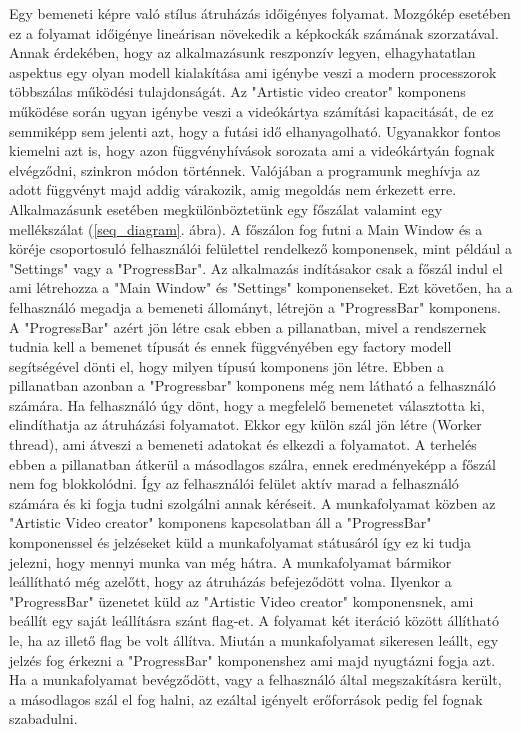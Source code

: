 \documentclass[12pt, a4paper, oneside]{book}
\theoremstyle{tetel}
\begin{document}
Egy bemeneti képre való stílus átruházás időigényes folyamat. Mozgókép esetében ez a folyamat időigénye lineárisan növekedik a képkockák számának szorzatával. Annak érdekében, hogy az alkalmazásunk reszponzív legyen, elhagyhatatlan aspektus egy olyan modell kialakítása ami igénybe veszi a modern processzorok többszálas működési tulajdonságát. Az "Artistic video creator" komponens működése során ugyan igénybe veszi a videókártya számítási kapacitását, de ez semmiképp sem jelenti azt, hogy a futási idő elhanyagolható. Ugyanakkor fontos kiemelni azt is, hogy azon függvényhívások sorozata ami a videókártyán fognak elvégződni, szinkron módon történnek. Valójában a programunk meghívja az adott függvényt majd addig várakozik, amig megoldás nem érkezett erre.
\newline
\indent
Alkalmazásunk esetében megkülönböztetünk egy főszálat valamint egy mellékszálat (\ref{seq_diagram}. ábra). A főszálon fog futni a Main Window és a köréje csoportosuló felhasználói felülettel rendelkező komponensek, mint például a "Settings" vagy a "ProgressBar". Az alkalmazás indításakor csak a főszál indul el ami létrehozza a "Main Window" és "Settings" komponenseket. Ezt követően, ha a felhasználó megadja a bemeneti állományt, létrejön a "ProgressBar" komponens. A "ProgressBar" azért jön létre csak ebben a pillanatban, mivel a rendszernek tudnia kell a bemenet típusát és ennek függvényében egy factory modell segítségével dönti el, hogy milyen típusú komponens jön létre. Ebben a pillanatban azonban a "Progressbar" komponens még nem látható a felhasználó számára.
\newline
\indent
Ha felhasználó úgy dönt, hogy a megfelelő bemenetet választotta ki, elindíthatja az átruházási folyamatot. Ekkor egy külön szál jön létre (Worker thread), ami átveszi a bemeneti adatokat és elkezdi a folyamatot. A terhelés ebben a pillanatban átkerül a másodlagos szálra, ennek eredményeképp a főszál nem fog blokkolódni. Így az felhasználói felület aktív marad a felhasználó számára és ki fogja tudni szolgálni annak kéréseit.
A munkafolyamat közben az "Artistic Video creator" komponens kapcsolatban áll a "ProgressBar" komponenssel és jelzéseket küld a munkafolyamat státusáról így ez ki tudja jelezni, hogy mennyi munka van még hátra. A munkafolyamat bármikor leállítható még azelőtt, hogy az átruházás befejeződött volna. Ilyenkor a "ProgressBar" üzenetet küld az "Artistic Video creator" komponensnek, ami beállít egy saját leállításra szánt flag-et. A folyamat két iteráció között állítható le, ha az illető flag be volt állítva. Miután a munkafolyamat sikeresen leállt, egy jelzés fog érkezni a "ProgressBar" komponenshez ami majd nyugtázni fogja azt. Ha a munkafolyamat bevégződött, vagy a felhasználó által megszakításra került, a másodlagos szál el fog halni, az ezáltal igényelt erőforrások pedig fel fognak szabadulni.
\end{document}
